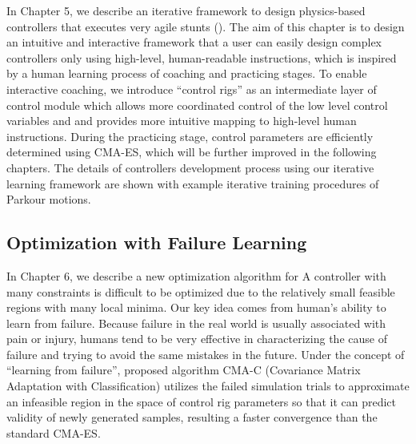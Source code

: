 In Chapter 5, we describe an iterative framework to design physics-based
controllers that executes very agile stunts ().
The aim of this chapter is to design an intuitive and interactive framework
that a user can easily design complex controllers only using high-level,
human-readable instructions, 
which is inspired by a human learning process of coaching and practicing stages.
To enable interactive coaching, we introduce ``control rigs'' as
an intermediate layer of control module which allows more coordinated control
of the low level control variables and and provides more intuitive mapping to
high-level human instructions. 
During the practicing stage, control parameters are efficiently determined
using CMA-ES, which will be further improved in the following chapters.
The details of controllers development process using our iterative learning
framework are shown with example iterative training procedures of Parkour
motions.

\subsection{Optimization with Failure Learning}
In Chapter 6, we describe a new optimization algorithm for
A controller with many constraints is difficult to be optimized due to the
relatively small feasible regions with many local minima.
Our key idea comes from human’s ability to learn from failure. 
Because failure in the real world is usually associated with pain or injury,
humans tend to be very effective in characterizing the cause of failure and
trying to avoid the same mistakes in the future. 
Under the concept of ``learning from failure'',  proposed algorithm CMA-C
(Covariance Matrix Adaptation with Classification) utilizes the failed
simulation trials to approximate an infeasible region in the space of control
rig parameters so that it can predict validity of newly generated samples,
resulting  a faster convergence than the standard CMA-ES.

